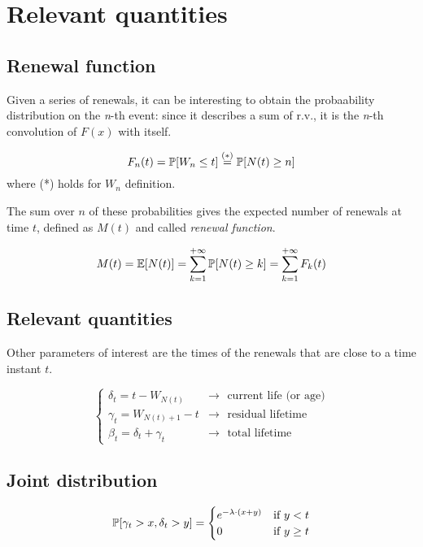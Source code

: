 \section{Relevant quantities}

\subsection{Renewal function}
	Given a series of renewals, it can be interesting to obtain the probaability distribution on the \emph{n}-th event: since it describes a sum of r.v., it is the \emph{n}-th convolution of $F(x)$ with itself.

	\begin{equation}
		F_n(t) = \mathbb{P}[W_n \le t] \stackrel{(*)}{=} \mathbb{P}[N(t) \ge n]
	\end{equation}
	where (*) holds for $W_n$ definition.

		\begin{definition}
			The sum over $n$ of these probabilities gives the expected number of renewals at time $t$, defined as $M(t)$ and called \emph{renewal function}.

			\begin{equation}
				M(t) = \mathbb{E}[N(t)] = \sum\limits_{k=1}^{+\infty}\mathbb{P}[N(t)\ge k] = \sum\limits_{k=1}^{+\infty} F_k(t)
			\end{equation}
		\end{definition}

\subsection{Relevant quantities}
	Other parameters of interest are the times of the renewals that are close to a time instant $t$.

	\begin{equation} \begin{cases}
		\delta_t = t - W_{N(t)} & \rightarrow
			\text{~~current life (or age)} \\
		\gamma_t = W_{N(t)+1}-t & \rightarrow
			\text{~~residual lifetime} \\
		\beta_t = \delta_t + \gamma_t & \rightarrow
			\text{~~total lifetime}
	\end{cases} \end{equation}

\subsection{Joint distribution}
\begin{equation}
	\mathbb{P}[\gamma_t > x, \delta_t > y ] =
	\begin{cases}
		e^{-\lambda \cdot (x+y)} & \text{if } y < t \\
		0 & \text{if } y \ge t \\
	\end{cases}
\end{equation}

